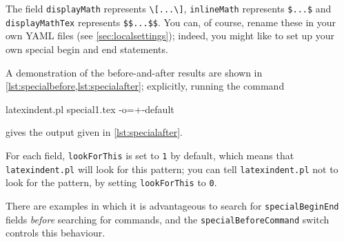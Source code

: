 \documentclass[10pt]{article}
\begin{document}
 The field \texttt{displayMath} represents \lstinline!\[...\]!, \texttt{inlineMath}
 represents \lstinline!$...$! and \texttt{displayMathTex} represents \lstinline!$$...$$!.
 You can, of course, rename these in your own YAML files (see \vref{sec:localsettings});
 indeed, you might like to set up your own special begin and end statements.

 \begin{example}
 A demonstration of the before-and-after results are shown in
 \cref{lst:specialbefore,lst:specialafter}; explicitly, running the command

 \begin{commandshell}
latexindent.pl special1.tex -o=+-default
 \end{commandshell}

 gives the output given in \cref{lst:specialafter}.

 \begin{cmhtcbraster}
 \end{cmhtcbraster}
 \end{example}

 For each field, \texttt{lookForThis} is set to \texttt{1} by default, which means that
 \texttt{latexindent.pl} will look for this pattern; you can tell \texttt{latexindent.pl}
 not to look for the pattern, by setting \texttt{lookForThis} to \texttt{0}.

 There are  examples in which it is
 advantageous to search for \texttt{specialBeginEnd} fields \emph{before} searching for
 commands, and the \texttt{specialBeforeCommand} switch controls this behaviour.
\end{document}
